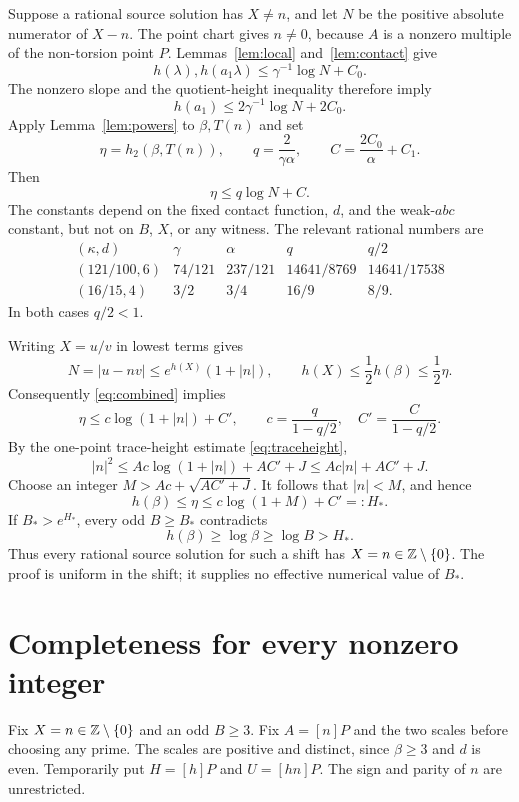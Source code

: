 \documentclass[11pt,a4paper]{article}
\begin{document}
Suppose a rational source solution has $X\ne n$, and let $N$
be the positive absolute numerator of $X-n$. The point chart gives
$n\ne0$, because $A$ is a nonzero multiple of the non-torsion point $P$.
Lemmas~\ref{lem:local} and~\ref{lem:contact} give
\[
 h(\lambda),h(a_1\lambda)\le\gamma^{-1}\log N+C_0.
\]
The nonzero slope and the quotient-height inequality therefore imply
\[
                       h(a_1)\le2\gamma^{-1}\log N+2C_0.
\]
Apply Lemma~\ref{lem:powers} to $\beta,T(n)$ and set
\[
 \eta=h_2(\beta,T(n)),\qquad q=\frac2{\gamma\alpha},\qquad
 C=\frac{2C_0}{\alpha}+C_1.
\]
Then
\begin{equation}\label{eq:combined}
                            \eta\le q\log N+C.
\end{equation}
The constants depend on the fixed contact function, $d$, and the
weak-$abc$ constant, but not on $B$, $X$, or any witness.
The relevant rational numbers are
\[
\begin{array}{c|c|c|c|c}
(\kappa,d)&\gamma&\alpha&q&q/2\\\hline
(121/100,6)&74/121&237/121&14641/8769&14641/17538\\
(16/15,4)&3/2&3/4&16/9&8/9.
\end{array}
\]
In both cases $q/2<1$.

Writing $X=u/v$ in lowest terms gives
\[
 N=|u-nv|\le e^{h(X)}(1+|n|),\qquad
 h(X)\le\frac12h(\beta)\le\frac12\eta.
\]
Consequently \eqref{eq:combined} implies
\[
 \eta\le c\log(1+|n|)+C',\qquad
 c=\frac q{1-q/2},\quad C'=\frac C{1-q/2}.
\]
By the one-point trace-height estimate \eqref{eq:traceheight},
\[
 |n|^2\le Ac\log(1+|n|)+AC'+J
                  \le Ac|n|+AC'+J.
\]
Choose an integer $M>Ac+\sqrt{AC'+J}$. It follows that $|n|<M$,
and hence
\[
                   h(\beta)\le\eta
                  \le c\log(1+M)+C'=:H_*.
\]
If $B_*>e^{H_*}$, every odd $B\ge B_*$ contradicts
\[
                      h(\beta)\ge\log\beta\ge\log B>H_*.
\]
Thus every rational source solution for such a shift has
$X=n\in\mathbb Z\setminus\{0\}$. The proof is uniform in the shift;
it supplies no effective numerical value of $B_*$.

\section{Completeness for every nonzero integer}\label{sec:complete}

Fix $X=n\in\mathbb Z\setminus\{0\}$ and an odd $B\ge3$.
Fix $A=[n]P$ and the two scales before choosing any prime.
The scales are positive and distinct, since $\beta\ge3$ and
$d$ is even. Temporarily put $H=[h]P$ and $U=[hn]P$.
The sign and parity of $n$ are unrestricted.
\end{document}

